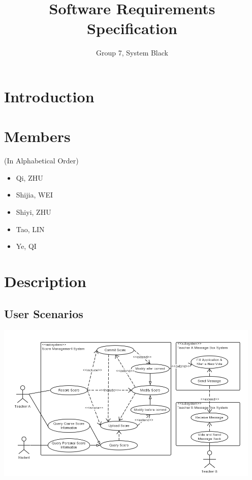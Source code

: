 \documentclass[a4]{article}
\author{Group 7, System Black}
\title{Software Requirements Specification}
\begin{document}
\maketitle
\section{Introduction}


\section{Members}
(In Alphabetical Order)
\begin{itemize}
\item Qi, ZHU

\item Shijia, WEI

\item Shiyi, ZHU

\item Tao, LIN

\item Ye, QI
\end{itemize}


\section{Description}

\subsection{User Scenarios}
\includegraphics[width=5in]{pic/1.png}
\end{document}
